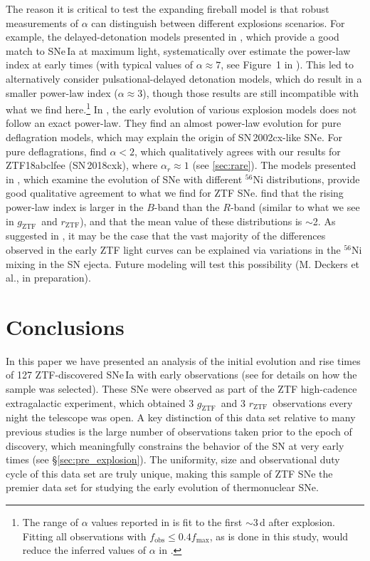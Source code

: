 \documentclass[twocolumn]{./aastex63}
\newcommand{\rztf}{$r_\mathrm{ZTF}$}
\newcommand{\gztf}{$g_\mathrm{ZTF}$}
\begin{document}
The reason it is critical to test the expanding fireball model is that robust
measurements of $\alpha$ can distinguish between different explosions
scenarios. For example, the delayed-detonation models presented in
\citet{Blondin13}, which provide a good match to SNe\,Ia at maximum light,
systematically over estimate the power-law index at early times (with typical
values of $\alpha \approx 7$, see Figure~1 in \citealt{Dessart14}). This led
\citet{Dessart14} to alternatively consider pulsational-delayed detonation
models, which do result in a smaller power-law index ($\alpha \approx 3$),
though those results are still incompatible with what we find
here.\footnote{The range of $\alpha$ values reported in \citet{Dessart14} is
fit to the first $\sim$3\,d after explosion. Fitting all observations with
$f_\mathrm{obs} \leq 0.4 f_\mathrm{max}$, as is done in this study, would
reduce the inferred values of $\alpha$ in \citet{Dessart14}.} In
\citet{Noebauer17}, the early evolution of various explosion models does not
follow an exact power-law. They find an almost power-law evolution for pure
deflagration models, which may explain the origin of SN\,2002cx-like SNe. For
pure deflagrations, \citet{Noebauer17} find $\alpha < 2$, which qualitatively
agrees with our results for ZTF18abclfee (SN\,2018cxk), where $\alpha_r
\approx 1$ (see \ref{sec:rare}). The models presented in \citet{Magee20},
which examine the evolution of SNe with different $^{56}$Ni distributions,
provide good qualitative agreement to what we find for ZTF SNe.
\citet{Magee20} find that the rising power-law index is larger in the $B$-band
than the $R$-band (similar to what we see in \gztf\ and \rztf), and that the
mean value of these distributions is $\sim$2. As suggested in \citet{Magee20},
it may be the case that the vast majority of the differences observed in the
early ZTF light curves can be explained via variations in the $^{56}$Ni mixing
in the SN ejecta. Future modeling will test this possibility (M. Deckers et
al., in preparation).

\section{Conclusions}

In this paper we have presented an analysis of the initial evolution and rise
times of 127 ZTF-discovered SNe\,Ia with early observations (see
\citealt{Yao19} for details on how the sample was selected). These SNe were
observed as part of the ZTF high-cadence extragalactic experiment, which
obtained 3 \gztf\ and 3 \rztf\ observations every night the telescope was
open. A key distinction of this data set relative to many previous studies is
the large number of observations taken prior to the epoch of discovery, which
meaningfully constrains the behavior of the SN at very early times (see
\S\ref{sec:pre_explosion}). The uniformity, size and observational duty cycle
of this data set are truly unique, making this sample of ZTF SNe the premier
data set for studying the early evolution of thermonuclear SNe.
\end{document}
